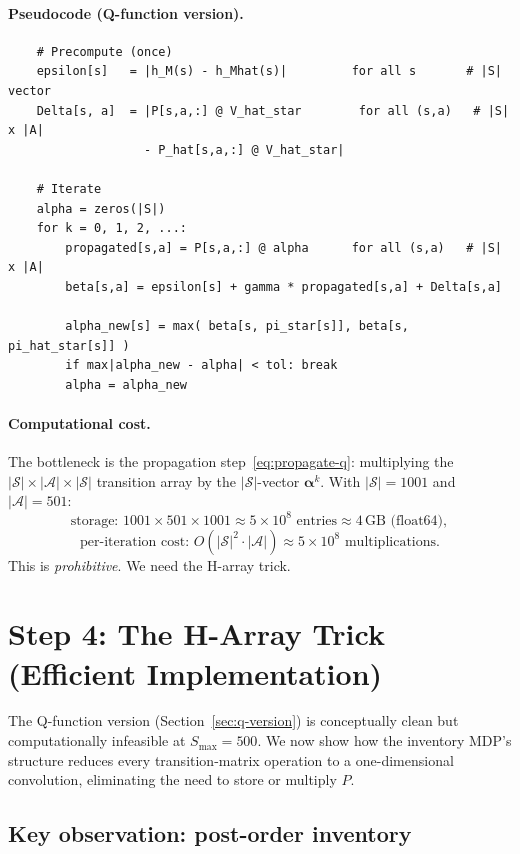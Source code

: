 \documentclass[11pt]{article}
\newcommand{\Smax}{S_{\max}}
\begin{document}
\paragraph{Pseudocode (Q-function version).}
\begin{verbatim}
    # Precompute (once)
    epsilon[s]   = |h_M(s) - h_Mhat(s)|         for all s       # |S| vector
    Delta[s, a]  = |P[s,a,:] @ V_hat_star        for all (s,a)   # |S| x |A|
                   - P_hat[s,a,:] @ V_hat_star|

    # Iterate
    alpha = zeros(|S|)
    for k = 0, 1, 2, ...:
        propagated[s,a] = P[s,a,:] @ alpha      for all (s,a)   # |S| x |A|
        beta[s,a] = epsilon[s] + gamma * propagated[s,a] + Delta[s,a]

        alpha_new[s] = max( beta[s, pi_star[s]], beta[s, pi_hat_star[s]] )
        if max|alpha_new - alpha| < tol: break
        alpha = alpha_new
\end{verbatim}

\paragraph{Computational cost.}
The bottleneck is the propagation step~\eqref{eq:propagate-q}: multiplying
the $|\mathcal{S}| \times |\mathcal{A}| \times |\mathcal{S}|$ transition
array by the $|\mathcal{S}|$-vector $\boldsymbol{\alpha}^k$.  With
$|\mathcal{S}| = 1001$ and $|\mathcal{A}| = 501$:
\[
  \text{storage: } 1001 \times 501 \times 1001 \approx 5 \times 10^8
  \text{ entries} \approx 4\,\text{GB (float64)},
\]
\[
  \text{per-iteration cost: } O(|\mathcal{S}|^2 \cdot |\mathcal{A}|)
  \approx 5 \times 10^8 \text{ multiplications}.
\]
This is \emph{prohibitive}.  We need the H-array trick.

\section{Step 4: The H-Array Trick (Efficient Implementation)}
\label{sec:h-array}

The Q-function version (Section~\ref{sec:q-version}) is conceptually clean
but computationally infeasible at $\Smax = 500$.  We now show how the
inventory MDP's structure reduces every transition-matrix operation to a
one-dimensional convolution, eliminating the need to store or multiply $P$.

\subsection{Key observation: post-order inventory}
\end{document}
